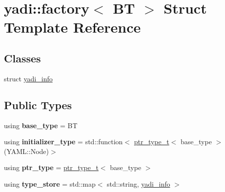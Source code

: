 \hypertarget{structyadi_1_1factory}{}\section{yadi\+:\+:factory$<$ BT $>$ Struct Template Reference}
\label{structyadi_1_1factory}
\subsection*{Classes}
\begin{DoxyCompactItemize}
\item 
struct \hyperlink{structyadi_1_1factory_1_1yadi__info}{yadi\+\_\+info}
\end{DoxyCompactItemize}
\subsection*{Public Types}
\begin{DoxyCompactItemize}
\item 
\mbox{\label{structyadi_1_1factory_aa53aaa7d106c458d492e767d39c93369}} 
using {\bfseries base\+\_\+type} = BT
\item 
\mbox{\label{structyadi_1_1factory_abda283c5fcd47651b797b8f2dd29a122}} 
using {\bfseries initializer\+\_\+type} = std\+::function$<$ \hyperlink{namespaceyadi_a92290eb27cd90666aa87b17d854af9fe}{ptr\+\_\+type\+\_\+t}$<$ base\+\_\+type $>$(Y\+A\+M\+L\+::\+Node)$>$
\item 
\mbox{\label{structyadi_1_1factory_a6e477a43b3072583702cc388e8028b47}} 
using {\bfseries ptr\+\_\+type} = \hyperlink{namespaceyadi_a92290eb27cd90666aa87b17d854af9fe}{ptr\+\_\+type\+\_\+t}$<$ base\+\_\+type $>$
\item 
\mbox{\label{structyadi_1_1factory_a4d95d91a535e999a61357303812130b2}} 
using {\bfseries type\+\_\+store} = std\+::map$<$ std\+::string, \hyperlink{structyadi_1_1factory_1_1yadi__info}{yadi\+\_\+info} $>$
\end{DoxyCompactItemize}
